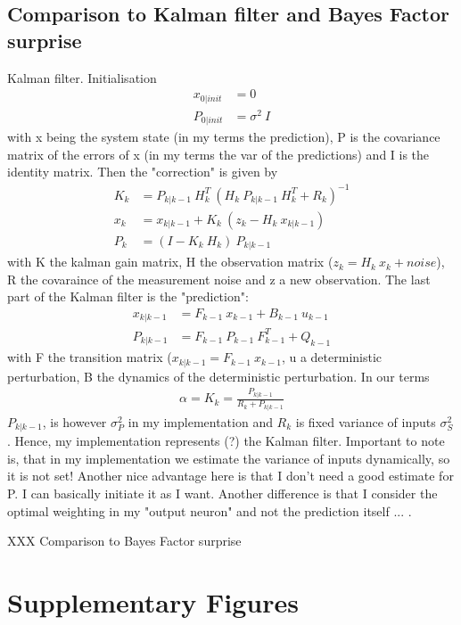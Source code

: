 \documentclass[10pt,a4paper,draft]{article}
\begin{document}
\subsection{Comparison to Kalman filter and Bayes Factor surprise}
%
Kalman filter. Initialisation
%
\begin{align*}
x_{0|init} &= 0 \\
P_{0|init} &= \sigma^2\ I
\end{align*}
%
with x being the system state (in my terms the prediction), P is the covariance matrix of the errors of x (in my terms the var of the predictions) and I is the identity matrix.
%
Then the "correction" is given by
%
\begin{align*}
K_k &= P_{k|k-1}\ H_k^T\ \left( H_k\ P_{k|k-1}\ H_k^T + R_k \right)^{-1} \\
x_k &= x_{k|k-1} + K_k\ \left( z_k - H_k\ x_{k|k-1}\right) \\
P_k &= \left( I - K_k\ H_k\right)\ P_{k|k-1}
\end{align*}
%
with K the kalman gain matrix, H the observation matrix ($z_k = H_k\ x_k + noise$), R the covaraince of the measurement noise and z a new observation. The last part of the Kalman filter is the "prediction":
%
\begin{align*}
x_{k|k-1} &= F_{k-1}\ x_{k-1} + B_{k-1}\ u_{k-1} \\
P_{k|k-1} &= F_{k-1}\ P_{k-1}\ F_{k-1}^T + Q_{k-1}
\end{align*}
%
with F the transition matrix ($x_{k|k-1} = F_{k-1}\ x_{k-1}$, u a deterministic perturbation, B the dynamics of the deterministic perturbation. In our terms
%
\begin{align*}
\alpha = K_k = \frac{P_{k|k-1}}{R_k + P_{k|k-1}}
\end{align*}
%
$P_{k|k-1}$, is however $\sigma_P^2$ in my implementation and $R_k$ is fixed variance of inputs $\sigma_S^2$. Hence, my implementation represents (?) the Kalman filter. Important to note is, that in my implementation we estimate the variance of inputs dynamically, so it is not set! Another nice advantage here is that I don't need a good estimate for P. I can basically initiate it as I want. Another difference is that I consider the optimal weighting in my "output neuron" and not the prediction itself ... .

XXX Comparison to Bayes Factor surprise

\section{Supplementary Figures}
\setcounter{figure}{0}
\renewcommand{\thefigure}{S\arabic{figure}}
\end{document}
